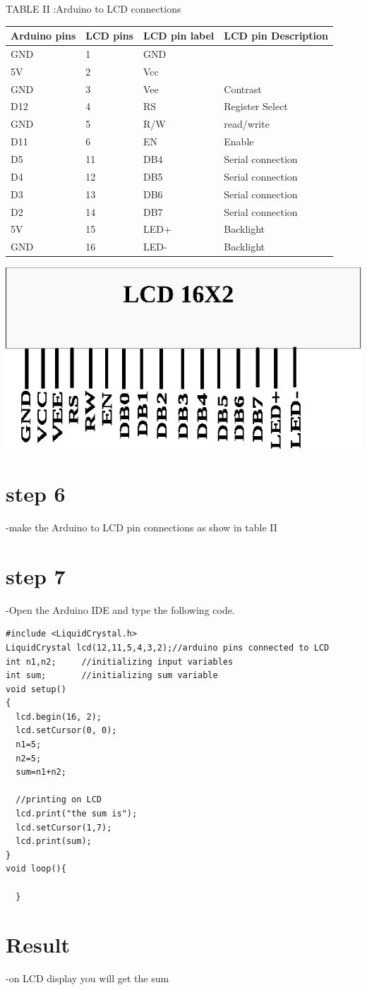 \documentclass[twocolumn,13pt]{article}
\begin{document}
\begin{center}
    TABLE II :Arduino to LCD connections
\end{center}
 \begin{tabular}{ |p{1.5cm}|p{1.5cm}|p{1.5cm}|p{1.5cm}| }
 \hline
 \setlength{\tabcolsep}{3pt}
Arduino pins & LCD pins & LCD pin label & LCD pin Description\\
\hline
 GND & 1& GND & \\
 \hline
 5V & 2 & Vcc &\\
 \hline
 GND & 3 & Vee & Contrast\\
 \hline
 D12 & 4 & RS & Register Select\\
 \hline
 GND & 5 & R/W & read/write\\
 \hline
 D11 & 6 & EN &Enable\\
 \hline
 D5 & 11 & DB4 & Serial connection\\
 \hline
 D4 & 12 & DB5 & Serial connection\\
 \hline
 D3 & 13 & DB6 & Serial connection\\
 \hline
 D2 & 14 & DB7 & Serial connection\\
 \hline
 5V & 15 & LED+ & Backlight\\
 \hline
 GND & 16 & LED- & Backlight\\
 \hline
\end{tabular}



\includegraphics[scale=0.3]{figs/lcd.png} 




\section*{step 6}
-make the Arduino to LCD pin connections as show in  table II
\section*{step 7}
-Open the Arduino IDE and type the following code.
\begin{verbatim}
#include <LiquidCrystal.h>
LiquidCrystal lcd(12,11,5,4,3,2);//arduino pins connected to LCD
int n1,n2;     //initializing input variables
int sum;       //initializing sum variable
void setup()
{
  lcd.begin(16, 2);
  lcd.setCursor(0, 0);
  n1=5;
  n2=5;
  sum=n1+n2;

  //printing on LCD
  lcd.print("the sum is");
  lcd.setCursor(1,7);
  lcd.print(sum);                     
}
void loop(){
    
  }
 \end{verbatim}


\section*{Result}
-on LCD display you will get the sum 
\end{document}
